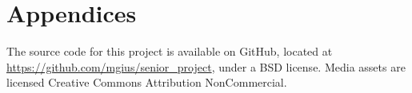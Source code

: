 \documentclass[11pt]{article}
\begin{document}
\section{Appendices}

The source code for this project is available on GitHub, located at \url{https://github.com/mgius/senior_project}, under a BSD license.  Media assets are licensed Creative Commons Attribution NonCommercial.





\end{document}
